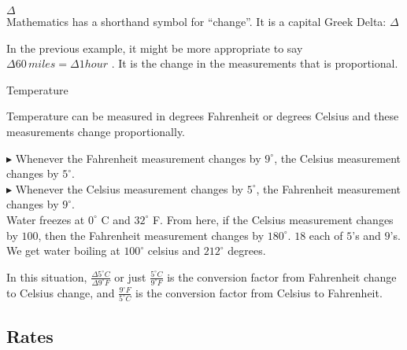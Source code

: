 \documentclass{ximera}
\begin{document}
\begin{notation}  \textbf{\textcolor{red!80!black}{$\Delta$}} \\


Mathematics has a shorthand symbol for ``change''.  It is a capital Greek Delta: $\Delta$

\end{notation}

In the previous example, it might be more appropriate to say \textbf{\textcolor{purple!85!blue}{$\Delta 60 \, miles = \Delta 1 hour$}} . It is the change in the measurements that is proportional.




\begin{example} Temperature


Temperature can be measured in degrees Fahrenheit or degrees Celsius and these measurements change proportionally. 


$\blacktriangleright$ Whenever the Fahrenheit measurement changes by $9^{\circ}$, the Celsius measurement changes by $5^{\circ}$. \\
$\blacktriangleright$ Whenever the Celsius measurement changes by $5^{\circ}$, the Fahrenheit measurement changes by $9^{\circ}$. \\



Water freezes at $0^{\circ}$ C and $32^{\circ}$ F.  From here, if the Celsius measurement changes by $100$, then the Fahrenheit measurement changes by $180^{\circ}$.  $18$ each of $5$'s and $9$'s. We get water boiling at $100^{\circ}$ celsius and $212^{\circ}$ degrees.


In this situation, $\frac{\Delta 5^{\circ}C}{\Delta 9^{\circ}F}$ or just $\frac{5^{\circ}C}{9^{\circ}F}$ is the conversion factor from Fahrenheit change to Celsius change, and $\frac{9^{\circ}F}{5^{\circ}C}$ is the conversion factor from Celsius to Fahrenheit.






\end{example} 
















\subsection{Rates}
\end{document}

